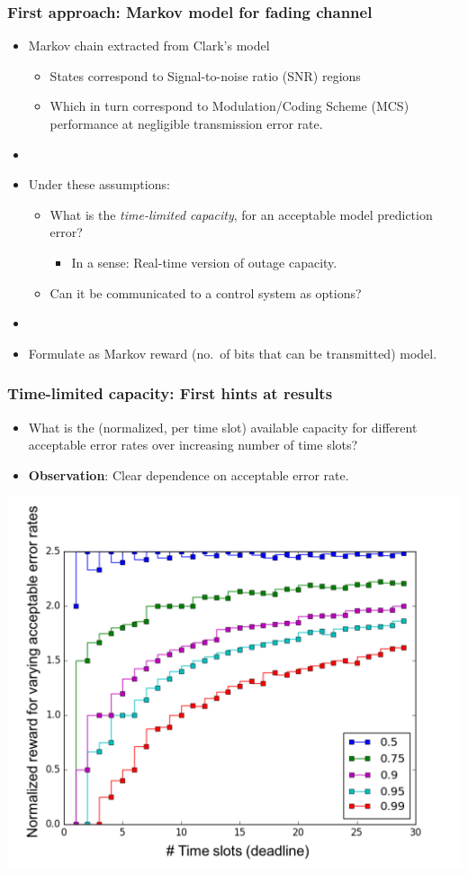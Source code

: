 \documentclass{beamer}
\begin{document}
\begin{frame}
  \frametitle{First approach: Markov model for fading channel}

  \begin{itemize}
  \item Markov chain extracted from  Clark's model 
    \begin{itemize}
    \item States correspond to Signal-to-noise ratio (SNR) regions
    \item Which in turn correspond to
      Modulation/Coding Scheme (MCS) performance at negligible transmission error rate.
    \end{itemize}
    \item[]
  \item Under these assumptions: 
    \begin{itemize}
    \item What is the \emph{time-limited capacity}, for an acceptable model prediction
      error?
      \begin{itemize}
      \item In a sense: Real-time version of outage capacity. 
      \end{itemize}
    \item Can it be communicated to a control system as options? 
    \end{itemize}
    \item[]
  \item Formulate as Markov reward (no.\ of bits that can be transmitted) model.
  \end{itemize}
\end{frame}
\begin{frame}
  \frametitle{Time-limited capacity: First hints at results}
  \begin{itemize}
  \item What is the (normalized, per time slot) {\color{blue}available capacity}
  for {\color{blue}different acceptable error rates} over {\color{blue}increasing number of time slots}?
  \item \textbf{Observation}: Clear dependence on acceptable error rate. 
  \end{itemize}
  
  \begin{center}
    \includegraphics[width=0.6\columnwidth]{rewards-correlated}
  \end{center}
\end{frame}
\end{document}
